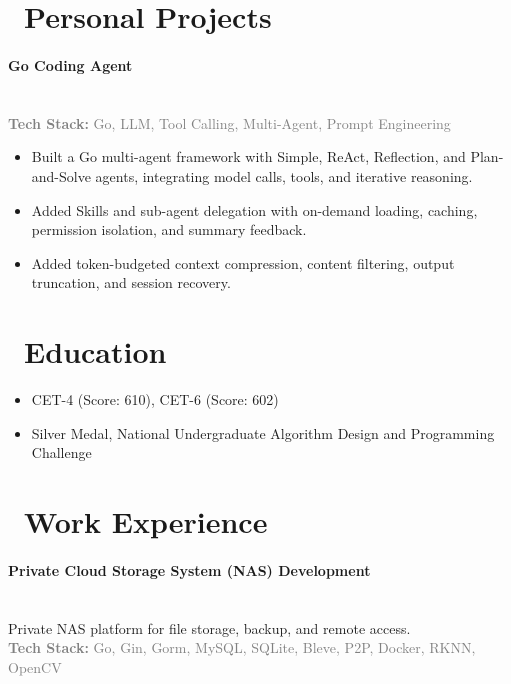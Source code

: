 \documentclass{resume}
\begin{document}
\section{\faCode\ Personal Projects}
\paragraph*{Go Coding Agent}\mbox{}\\
{\small
\noindent\textcolor{gray}{\textbf{Tech Stack:} Go, LLM, Tool Calling, Multi-Agent, Prompt Engineering}
}
\vspace{0.3ex}

\begin{itemize}
    \item Built a Go multi-agent framework with Simple, ReAct, Reflection, and Plan-and-Solve agents, integrating model calls, tools, and iterative reasoning.
    \item Added Skills and sub-agent delegation with on-demand loading, caching, permission isolation, and summary feedback.
    \item Added token-budgeted context compression, content filtering, output truncation, and session recovery.
\end{itemize}

\section{\faGraduationCap\ Education}
\begin{itemize}
\item CET-4 (Score: 610), CET-6 (Score: 602)
\item Silver Medal, National Undergraduate Algorithm Design and Programming Challenge
\end{itemize}

\section{\faSuitcase\ Work Experience}

\paragraph*{Private Cloud Storage System (NAS) Development}\mbox{}\\
{\small
\noindent Private NAS platform for file storage, backup, and remote access.\\
\noindent\textcolor{gray}{\textbf{Tech Stack:} Go, Gin, Gorm, MySQL, SQLite, Bleve, P2P, Docker, RKNN, OpenCV}
}
\vspace{0.3ex}
\vspace{0.3ex}
\end{document}
